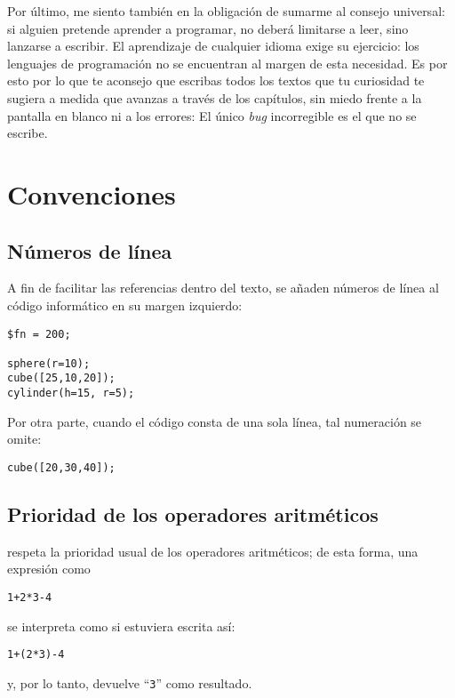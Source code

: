 Por último, me siento también en la obligación de sumarme al consejo
universal: si alguien pretende aprender a programar, no deberá
limitarse a leer, sino lanzarse a escribir. El aprendizaje de
cualquier idioma exige su ejercicio: los lenguajes de programación no
se encuentran al margen de esta necesidad. Es por esto por lo que te
aconsejo que escribas todos los textos que tu curiosidad te sugiera a
medida que avanzas a través de los capítulos, sin miedo frente a la
pantalla en blanco ni a los errores: El único \emph{bug} incorregible
es el que no se escribe.


\vfill

\section{Convenciones}

\subsection{Números de línea}

A fin de facilitar las referencias dentro del texto, se añaden números
de línea al código informático en su margen izquierdo:

\begin{lstlisting}
$fn = 200;

sphere(r=10);
cube([25,10,20]);
cylinder(h=15, r=5);
\end{lstlisting}%

Por otra parte, cuando el código consta de una sola línea, tal
numeración se omite:

\begin{lstlisting}[numbers=none]
cube([20,30,40]);
\end{lstlisting}


\subsection{Prioridad de los operadores aritméticos}

\openscad{} respeta la prioridad usual de los operadores aritméticos;
de esta forma, una expresión como
  \begin{lstlisting}[numbers=none]
1+2*3-4    
  \end{lstlisting}
se interpreta como si estuviera escrita así:
  \begin{lstlisting}[numbers=none]
1+(2*3)-4    
  \end{lstlisting}
y, por lo tanto, devuelve ``\texttt{3}'' como resultado.



